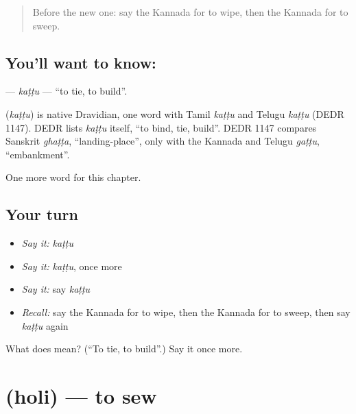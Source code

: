 \label{lesson:KA-C150-kattu}



\begin{quote}
Before the new one: say the Kannada for to wipe, then the Kannada for to sweep.
\end{quote}

\subsection*{You'll want to know: }
\textbf{} — \emph{kaṭṭu} — \textquotedblleft{}to tie, to build\textquotedblright{}.

\begin{cousinweb}
\textbf{} (\emph{kaṭṭu}) is native Dravidian, one word with Tamil \emph{kaṭṭu} and Telugu \emph{kaṭṭu} (DEDR 1147). DEDR lists \emph{kaṭṭu} itself, \textquotedblleft{}to bind, tie, build\textquotedblright{}. DEDR 1147 compares Sanskrit \emph{ghaṭṭa}, \textquotedblleft{}landing-place\textquotedblright{}, only with the Kannada and Telugu \emph{gaṭṭu}, \textquotedblleft{}embankment\textquotedblright{}.
\end{cousinweb}

\begin{grammarlens}[title={What you've built}]
One more word for this chapter.
\end{grammarlens}

\subsection*{Your turn}
\begin{itemize}
\raggedright
  \item \emph{Say it:} \emph{kaṭṭu}
  \item \emph{Say it:} \emph{kaṭṭu}, once more
  \item \emph{Say it:} say \emph{kaṭṭu}
  \item \emph{Recall:} say the Kannada for to wipe, then the Kannada for to sweep, then say \emph{kaṭṭu} again
\end{itemize}

\begin{tcolorbox}[breakable,colback=teal!4,colframe=teal!35!black,title={Before you move on}]
What does  mean? (\textquotedblleft{}To tie, to build\textquotedblright{}.) Say it once more.
\end{tcolorbox}
\section[\texorpdfstring{\kn{ಹೊಲಿ} (holi)}{ಹೊಲಿ (holi)}]{ (holi) — to sew}

